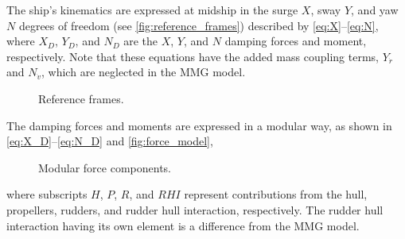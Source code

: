 The ship's kinematics are expressed at midship 
in the surge $X$, sway $Y$, and yaw $N$ degrees of freedom (see \autoref{fig:reference_frames}) described by \autoref{eq:X}--\autoref{eq:N}, where $X_D$, $Y_D$, and $N_D$ are the $X$, $Y$, and $N$ damping forces and moment, respectively. Note that these equations have the added mass coupling terms, $Y_{\dot{r}}$ and $N_{\dot{v}}$, which are neglected in the MMG model.
%
\begin{figure}[h]
    \centering
    
    \caption{Reference frames.}
    \label{fig:reference_frames}
\end{figure}
%
\begin{equation}
    \label{eq:X}
    
\end{equation}
%
\begin{equation}
    \label{eq:Y}
    
\end{equation}
%
\begin{equation}
    \label{eq:N}
    
\end{equation}
The damping forces and moments are expressed in a modular way, as shown in \autoref{eq:X_D}--\autoref{eq:N_D} and \autoref{fig:force_model},
\begin{equation}
    \label{eq:X_D}
    
\end{equation}
%
\begin{equation}
    \label{eq:Y_D}
    
\end{equation}
%
\begin{equation}
    \label{eq:N_D}
    
\end{equation}
%
\begin{figure}[h]
    \centering
    
    \caption{Modular force components.}
    \label{fig:force_model}
\end{figure}
where subscripts $H$, $P$, $R$, and $RHI$ represent contributions from the hull, propellers, rudders, and rudder hull interaction, respectively. The rudder hull interaction having its own element is a difference from the MMG model.

